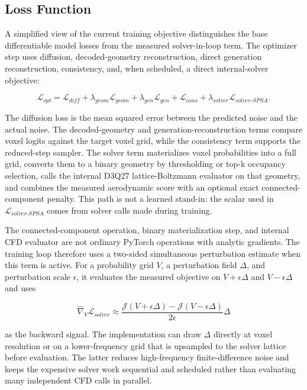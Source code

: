 \subsection{Loss Function}
A simplified view of the current training objective distinguishes the base differentiable model losses from the measured solver-in-loop term. The optimizer step uses diffusion, decoded-geometry reconstruction, direct generation reconstruction, consistency, and, when scheduled, a direct internal-solver objective:

\begin{equation}
\mathcal{L}_{opt} =
\mathcal{L}_{diff}
+ \lambda_{geom}\mathcal{L}_{geom}
+ \lambda_{gen}\mathcal{L}_{gen}
+ \mathcal{L}_{cons}
+ \lambda_{solver}\mathcal{L}_{solver\mbox{-}SPSA}.
\end{equation}

The diffusion loss is the mean squared error between the predicted noise and the actual noise. The decoded-geometry and generation-reconstruction terms compare voxel logits against the target voxel grid, while the consistency term supports the reduced-step sampler. The solver term materializes voxel probabilities into a full grid, converts them to a binary geometry by thresholding or top-k occupancy selection, calls the internal D3Q27 lattice-Boltzmann evaluator on that geometry, and combines the measured aerodynamic score with an optional exact connected-component penalty. This path is not a learned stand-in: the scalar used in \(\mathcal{L}_{solver\mbox{-}SPSA}\) comes from solver calls made during training.

The connected-component operation, binary materialization step, and internal CFD evaluator are not ordinary PyTorch operations with analytic gradients. The training loop therefore uses a two-sided simultaneous perturbation estimate when this term is active. For a probability grid \(V\), a perturbation field \(\Delta\), and perturbation scale \(\epsilon\), it evaluates the measured objective on \(V+\epsilon\Delta\) and \(V-\epsilon\Delta\) and uses

\begin{equation}
\widehat{\nabla}_V \mathcal{L}_{solver}
\approx
\frac{\mathcal{J}(V+\epsilon\Delta)-\mathcal{J}(V-\epsilon\Delta)}
{2\epsilon}\Delta
\end{equation}

as the backward signal. The implementation can draw \(\Delta\) directly at voxel resolution or on a lower-frequency grid that is upsampled to the solver lattice before evaluation. The latter reduces high-frequency finite-difference noise and keeps the expensive solver work sequential and scheduled rather than evaluating many independent CFD calls in parallel.

